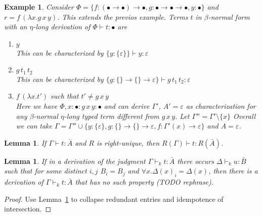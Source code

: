 \documentclass[10pt,a4paper]{article}
\theoremstyle{plain}%
\newtheorem{lemma}[theorem]{Lemma}
\newtheorem{example}[theorem]{Example}
\begin{document}
\begin{example}
Consider $\Phi = \{f : (\bullet \to \bullet) \to \bullet, g : \bullet \to \bullet \to \bullet, y : \bullet\}$ and $r = f\,(\lambda x.g\,x\,y)$.
This extends the previos example.
Terms $t$ in $\beta$-normal form with an $\eta$-long derivation of $\Phi \vdash t : \bullet$ are
\begin{enumerate}
\item $y$\\
This can be characterized by $\{y : \{\varepsilon\}\} \vdash y : \varepsilon$
\item $g\,t_1\,t_2$\\
This can be characterized by $\{g : \{\} \to \{\} \to \varepsilon \} \vdash g\,t_1\,t_2 : \varepsilon$
\item $f\,(\lambda x.t')$ such that $t' \neq g\,x\,y$\\
Here we have $\Phi, x : \bullet : g\,x\,y : \bullet$ and can derive $\Gamma'$, $A' = \varepsilon$ as characterization for any $\beta$-normal $\eta$-long typed term different from $g\,x\,y$.
Let $\Gamma'' = \Gamma' \setminus \{x\}$
Overall we can take $\Gamma = \Gamma'' \cup \{y : \{\varepsilon\}, g : \{\} \to \{\} \to \varepsilon, f : \Gamma'(x) \to \varepsilon\}$ and $A = \varepsilon$.
\end{enumerate}
\end{example}

\begin{lemma}
\label{lem:transform}
If $\Gamma \vdash t : \bar{A}$ and $R$ is right-unique, then $R(\Gamma) \vdash t : R(\bar{A})$.
\end{lemma}

\begin{lemma}
If in a derivation of the judgment $\Gamma \vdash_k t : \bar{A}$ there occurs $\Delta \vdash_k u : \bar{B}$ such that for some distinct $i, j$
$B_i = B_j$ and $\forall x.\Delta(x)_i = \Delta(x)$, then there is a derivation of $\Gamma \vdash_k t : \bar{A}$ that has no such property (TODO rephrase).
\end{lemma}

\begin{proof}
Use Lemma~\ref{lem:transform} to collapse redundant entries and idempotence of intersection.
\end{proof}

\newpage
\end{document}
